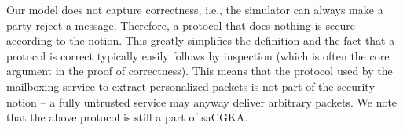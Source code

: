 \begin{description}[itemsep=0pt]
	
	\item [No correctness guarantees] Our model does not capture correctness, i.e., the simulator can always make a
      party reject a message. Therefore, a protocol that does nothing is secure according to the notion. This greatly
      simplifies the definition and the fact that a protocol is correct typically easily follows by inspection (which is
      often the core argument in the proof of correctness).
	This means that the protocol used by the mailboxing service to extract personalized packets is not part of the security notion -- a fully untrusted service may anyway deliver arbitrary packets. We note that the above protocol is still a part of saCGKA.
\end{description}
